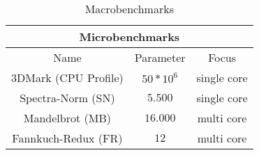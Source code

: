 \begin{table}[H]
    \centering
    \begin{tabular}{|| c | c | c ||}
    \hline
    \multicolumn{3}{||c||}{Microbenchmarks} \\ [0.5ex] \hline\hline
    Name & Parameter & Focus \\\hline
    3DMark (CPU Profile) & $50*10^6$ & single core \\
    Spectra-Norm (SN) & $5.500$ & single core \\
    Mandelbrot (MB) & $16.000$ & multi core \\
    Fannkuch-Redux (FR) & $12$ & multi core \\\hline
    \end{tabular}
    \caption{Macrobenchmarks}
    \label{tab:macrobenchmarks}
\end{table}